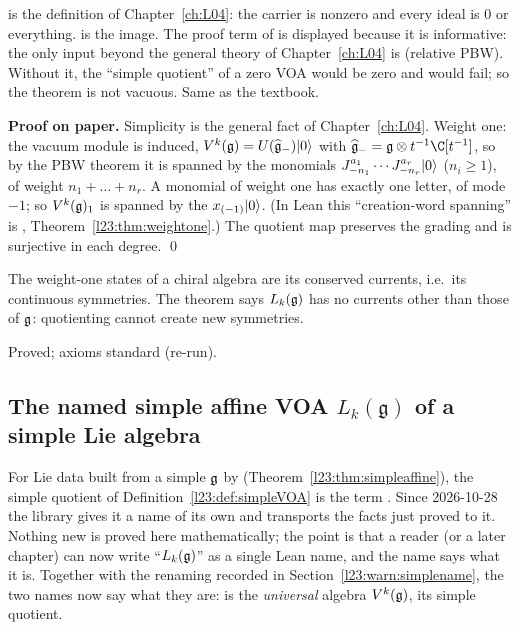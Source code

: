 \begin{dictionary}
 is the definition of Chapter~\ref{ch:L04}: the carrier is nonzero and every ideal is $0$ or everything.
 is the image. The proof term of  is displayed because it is informative: the
only input beyond the general theory of Chapter~\ref{ch:L04} is  (relative PBW). Without it, the
``simple quotient'' of a zero VOA would be zero and  would fail; so the theorem is not vacuous.
Same as the textbook.
\end{dictionary}

\textbf{Proof on paper.} Simplicity is the general fact of Chapter~\ref{ch:L04}. Weight one: the vacuum module is induced,
$V^k(\mathfrak g)=U(\widehat{\mathfrak g}_-)|0\rangle$ with $\widehat{\lxxiiig}_-=\lxxiiig\otimes t^{-1}\C[t^{-1}]$, so by the PBW theorem it is
spanned by the monomials $J^{a_1}_{-n_1}\cdots J^{a_r}_{-n_r}|0\rangle$ ($n_i\ge1$), of weight $n_1+\dots+n_r$. A monomial of weight one
has exactly one letter, of mode $-1$; so $V^k(\mathfrak g)_1$ is spanned by the $x_{(-1)}|0\rangle$. (In Lean this ``creation-word spanning''
is , Theorem~\ref{l23:thm:weightone}.) The quotient map preserves the grading and is surjective in each
degree. \qed

\begin{physics}
The weight-one states of a chiral algebra are its conserved currents, i.e.\ its continuous symmetries. The theorem says
$L_k(\mathfrak g)$ has no currents other than those of $\mathfrak g$: quotienting cannot create new symmetries.
\end{physics}

\begin{status}
Proved; axioms standard (re-run).
\end{status}

\subsection{The named simple affine VOA \texorpdfstring{$L_k(\mathfrak g)$}{L\_k(g)} of a simple Lie algebra}\label{l23:sec:simplename}

For Lie data built from a simple $\mathfrak g$ by  (Theorem~\ref{l23:thm:simpleaffine}), the simple quotient of
Definition~\ref{l23:def:simpleVOA} is the term . Since 2026-10-28 the library gives it a name of its own and transports the facts just proved to it. Nothing new is proved here
mathematically; the point is that a reader (or a later chapter) can now write ``$L_k(\mathfrak g)$'' as a single Lean name, and the name
says what it is. Together with the renaming recorded in Section~\ref{l23:warn:simplename}, the two names now say what they are:
 is the \emph{universal} algebra $V^k(\mathfrak g)$,  its simple quotient.

